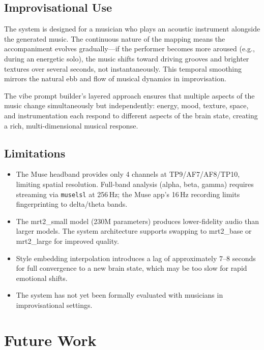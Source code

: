 \documentclass[manuscript,review,anonymous]{acmart}
\begin{document}
\subsection{Improvisational Use}

The system is designed for a musician who plays an acoustic instrument alongside the generated music. The continuous nature of the mapping means the accompaniment evolves gradually---if the performer becomes more aroused (e.g., during an energetic solo), the music shifts toward driving grooves and brighter textures over several seconds, not instantaneously. This temporal smoothing mirrors the natural ebb and flow of musical dynamics in improvisation.

The vibe prompt builder's layered approach ensures that multiple aspects of the music change simultaneously but independently: energy, mood, texture, space, and instrumentation each respond to different aspects of the brain state, creating a rich, multi-dimensional musical response.

\subsection{Limitations}

\begin{itemize}[nosep]
  \item The Muse headband provides only 4 channels at TP9/AF7/AF8/TP10, limiting spatial resolution. Full-band analysis (alpha, beta, gamma) requires streaming via \texttt{muselsl} at 256\,Hz; the Muse app's 16\,Hz recording limits fingerprinting to delta/theta bands.
  \item The mrt2\_small model (230M parameters) produces lower-fidelity audio than larger models. The system architecture supports swapping to mrt2\_base or mrt2\_large for improved quality.
  \item Style embedding interpolation introduces a lag of approximately 7--8 seconds for full convergence to a new brain state, which may be too slow for rapid emotional shifts.
  \item The system has not yet been formally evaluated with musicians in improvisational settings.
\end{itemize}

\section{Future Work}
\end{document}
